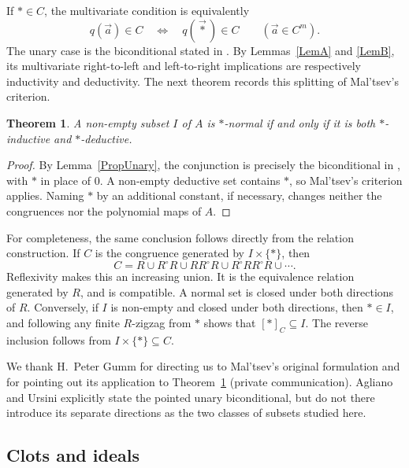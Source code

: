\documentclass[12pt,english]{amsart}
\newtheorem{theorem}{Theorem}[section]
\theoremstyle{definition}
\numberwithin{equation}{section}
\theoremstyle{remark}
\renewcommand{\top}{\ast}
\begin{document}
If $\top\in C$, the multivariate condition is equivalently
\[
q(\vec a)\in C\quad\Longleftrightarrow\quad q(\vec\top)\in C
\qquad(\vec a\in C^m).
\]
The unary case is the biconditional stated in \cite[Proposition 1.4(4)]{AU92}. By Lemmas~\ref{LemA} and \ref{LemB}, its multivariate right-to-left and left-to-right implications are respectively inductivity and deductivity. The next theorem records this splitting of Mal'tsev's criterion.

\begin{theorem}\label{ThmA}
A non-empty subset $I$ of $A$ is $\top$-normal if and only if it is both $\top$-inductive and $\top$-deductive.
\end{theorem}

\begin{proof}
By Lemma~\ref{PropUnary}, the conjunction is precisely the biconditional in \cite[Proposition 1.4(4)]{AU92}, with $\top$ in place of $0$. A non-empty deductive set contains $\top$, so Mal'tsev's criterion applies. Naming $\top$ by an additional constant, if necessary, changes neither the congruences nor the polynomial maps of $A$.
\end{proof}

For completeness, the same conclusion follows directly from the relation construction. If $C$ is the congruence generated by $I\times\{\top\}$, then
\begin{equation}\label{EquF}
C=R\cup R^\circ R\cup RR^\circ R\cup R^\circ RR^\circ R\cup\cdots.
\end{equation}
Reflexivity makes this an increasing union. It is the equivalence relation generated by $R$, and is compatible. A normal set is closed under both directions of $R$. Conversely, if $I$ is non-empty and closed under both directions, then $\top\in I$, and following any finite $R$-zigzag from $\top$ shows that $[\top]_C\subseteq I$. The reverse inclusion follows from $I\times\{\top\}\subseteq C$.

We thank H.~Peter Gumm for directing us to Mal'tsev's original formulation and for pointing out its application to Theorem~\ref{ThmA} (private communication). Agliano and Ursini explicitly state the pointed unary biconditional, but do not there introduce its separate directions as the two classes of subsets studied here.

\subsection{Clots and ideals}
\end{document}
